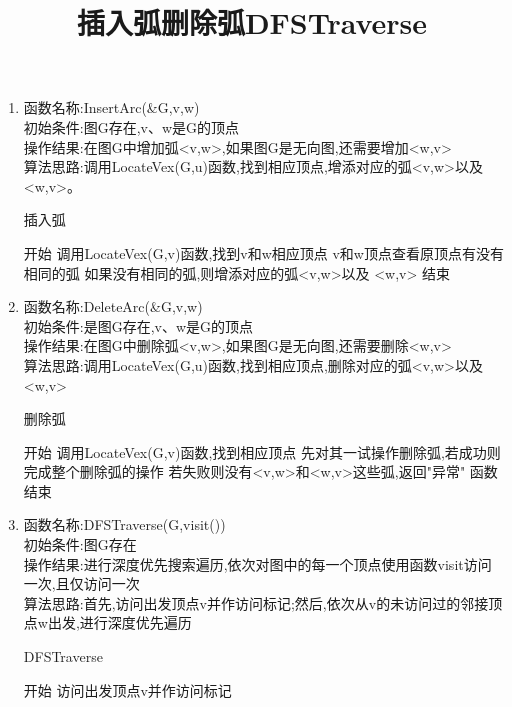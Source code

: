 \documentclass[supercite]{HustGraduPaper}
\theoremstyle{definition}
\begin{document}
\begin{enumerate}
\begin{algorithm}[htb]
	      \end{algorithm}
	\item 函数名称:InsertArc(\&G,v,w)\\
	      初始条件:图G存在,v、w是G的顶点\\
	      操作结果:在图G中增加弧<v,w>,如果图G是无向图,还需要增加<w,v>\\
	      算法思路:调用LocateVex(G,u)函数,找到相应顶点,增添对应的弧<v,w>以及 <w,v>。
	      \begin{algorithm}[htb]
		      \title{插入弧}
		      \caption{插入弧}
		      \begin{algorithmic}[1]
			      \State 开始
			      \State 调用LocateVex(G,v)函数,找到v和w相应顶点
			      \State v和w顶点查看原顶点有没有相同的弧
			      \State 如果没有相同的弧,则增添对应的弧<v,w>以及 <w,v>
			      \State 结束
		      \end{algorithmic}\label{G9}
	      \end{algorithm}
	\item 函数名称:DeleteArc(\&G,v,w)\\
	      初始条件:是图G存在,v、w是G的顶点\\
	      操作结果:在图G中删除弧<v,w>,如果图G是无向图,还需要删除<w,v>\\
	      算法思路:调用LocateVex(G,u)函数,找到相应顶点,删除对应的弧<v,w>以及 <w,v>
	      \newpage
	      \begin{algorithm}[htb]
		      \title{删除弧}
		      \caption{删除弧}
		      \begin{algorithmic}[1]
			      \State 开始
			      \State 调用LocateVex(G,v)函数,找到相应顶点
			      \State 先对其一试操作删除弧,若成功则完成整个删除弧的操作
			      \State 若失败则没有<v,w>和<w,v>这些弧,返回"异常"
			      \State 函数结束
		      \end{algorithmic}\label{G10}
	      \end{algorithm}
	\item 函数名称:DFSTraverse(G,visit())\\
	      初始条件:图G存在\\
	      操作结果:进行深度优先搜索遍历,依次对图中的每一个顶点使用函数visit访问一次,且仅访问一次\\
	      算法思路:首先,访问出发顶点v并作访问标记;然后,依次从v的未访问过的邻接顶点w出发,进行深度优先遍历
	      \begin{algorithm}[htb]
		      \title{DFSTraverse}
		      \caption{DFSTraverse}
		      \begin{algorithmic}[1]
			      \State 开始
			      \State 访问出发顶点v并作访问标记

\end{algorithmic}
\end{algorithm}
\end{enumerate}
\end{document}
